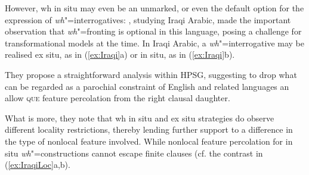 \documentclass[output=paper
                ,modfonts
                ,nonflat
	        ,collection
	        ,collectionchapter
	        ,collectiontoclongg
 	        ,biblatex
                ,babelshorthands
                ,newtxmath
                ,draftmode
                ,colorlinks, citecolor=brown
]{./langsci/langscibook}
\begin{document}
{However, wh in situ may even be an unmarked, or even the default option for the expression of \emph{wh}"=interrogatives: 
\citet{Johnson:Lappin:97},  studying Iraqi Arabic, made the important observation that \emph{wh}"=fronting is optional in this language, posing a challenge for transformational models at the time.   
In Iraqi Arabic, a \emph{wh}"=interrogative may be realised ex situ, as in (\ref{ex:Iraqi}a) or in situ, as in (\ref{ex:Iraqi}b). 

\begin{exe}
  \ex \label{ex:Iraqi}
  \begin{xlist}
    
  \end{xlist}

\end{exe}

\noindent
They propose a straightforward analysis within HPSG, suggesting to drop what can be regarded as a parochial constraint of English and related languages an allow  \textsc{que} feature percolation from the right clausal daughter. 
 
 What is more, they note that wh in situ and ex situ strategies do observe different locality restrictions, thereby lending further support to a difference in the type of nonlocal feature involved. While nonlocal feature percolation for in situ \emph{wh}"=constructions cannot escape finite clauses (cf. the contrast in (\ref{ex:IraqiLoc}a,b).
    
 \begin{exe}
  \ex \label{ex:IraqiLoc}
  \begin{xlist}
    
  \end{xlist}


\end{exe}}
\end{document}
